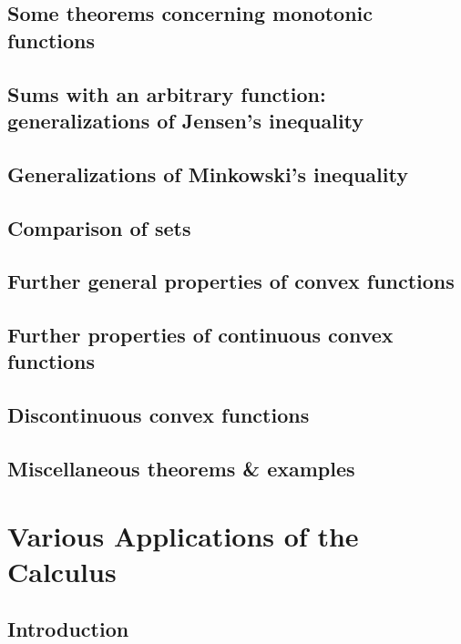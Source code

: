 \documentclass[oneside]{book}
\numberwithin{equation}{section}
\begin{document}
\subsection{Some theorems concerning monotonic functions}

\subsection{Sums with an arbitrary function: generalizations of Jensen's inequality}

\subsection{Generalizations of Minkowski's inequality}

\subsection{Comparison of sets}

\subsection{Further general properties of convex functions}

\subsection{Further properties of continuous convex functions}

\subsection{Discontinuous convex functions}

\subsection{Miscellaneous theorems \& examples}


\section{Various Applications of the Calculus}

\subsection{Introduction}
\end{document}
